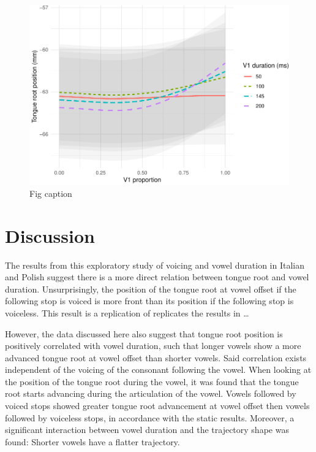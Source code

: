 \documentclass[12pt,]{article}
\begin{document}
\begin{figure}
\includegraphics[width=\linewidth]{2018-tra_files/figure-latex/tra-gam-2-plot-1} \caption{Fig caption}\label{f:tra-gam-2-plot}
\end{figure}

\section{Discussion}\label{discussion}

\label{s:discussion}

The results from this exploratory study of voicing and vowel duration in
Italian and Polish suggest there is a more direct relation between
tongue root and vowel duration. Unsurprisingly, the position of the
tongue root at vowel offset if the following stop is voiced is more
front than its position if the following stop is voiceless. This result
is a replication of replicates the results in \ldots{}

However, the data discussed here also suggest that tongue root position
is positively correlated with vowel duration, such that longer vowels
show a more advanced tongue root at vowel offset than shorter vowels.
Said correlation exists independent of the voicing of the consonant
following the vowel. When looking at the position of the tongue root
during the vowel, it was found that the tongue root starts advancing
during the articulation of the vowel. Vowels followed by voiced stops
showed greater tongue root advancement at vowel offset then vowels
followed by voiceless stops, in accordance with the static results.
Moreover, a significant interaction between vowel duration and the
trajectory shape was found: Shorter vowels have a flatter trajectory.
\end{document}
